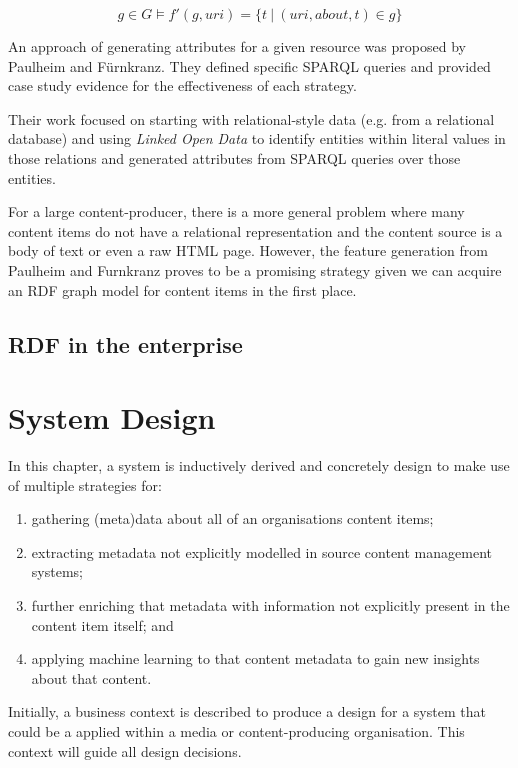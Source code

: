 \documentclass[10pt,a4paper]{report}
\begin{document}
$$
g \in G \models f'(g, uri) = \{t \: | \: (uri, about, t) \in g\} 
$$

An approach of generating attributes for a given resource was proposed by
Paulheim and F\"urnkranz\cite{paulheim2012unsupervised}. They defined specific
SPARQL queries and provided case study evidence for the effectiveness of
each strategy.

Their work focused on starting with relational-style data (e.g. from a
relational database) and using \emph{Linked Open Data} to identify entities
within literal values in those relations and generated attributes from
SPARQL queries over those entities.

For a large content-producer, there is a more general problem where many content
items do not have a relational representation and the content source is a body
of text or even a raw HTML page. However, the feature generation from Paulheim
and F\:urnkranz proves to be a promising strategy given we can acquire an RDF
graph model for content items in the first place.

\section{RDF in the enterprise}
\label{sec:linked-enterprise-data}

\chapter{System Design}

In this chapter, a system is inductively derived and concretely design to make
use of multiple strategies for:

\begin{enumerate}
\item gathering (meta)data about all of an organisations content items;
\item extracting metadata not explicitly modelled in source content management
systems;
\item further enriching that metadata with information not explicitly present
in the content item itself; and
\item applying machine learning to that content metadata to gain new insights
about that content.
\end{enumerate}

Initially, a business context is described to produce a design for a system
that could be a applied within a media or content-producing organisation. This
context will guide all design decisions.
\end{document}
